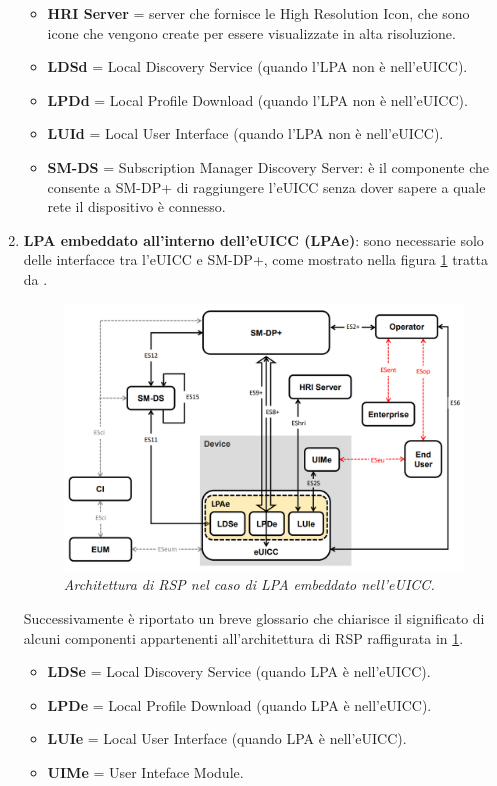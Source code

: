\documentclass[10pt, oneside]{book}
\begin{document}
\begin{enumerate}
\begin{itemize}
\item \textbf{HRI Server} = server che fornisce le High Resolution Icon, che sono icone che vengono create per essere visualizzate in alta risoluzione.
\item \textbf{LDSd} = Local Discovery Service (quando l'LPA non è nell'eUICC).
\item \textbf{LPDd} = Local Profile Download (quando l'LPA non è nell'eUICC).
\item \textbf{LUId} = Local User Interface (quando l'LPA non è nell'eUICC).
\item \textbf{SM-DS} = Subscription Manager Discovery Server: è il componente che consente a SM-DP+ di raggiungere l'eUICC senza dover sapere a quale rete il dispositivo è connesso.
\end{itemize}
\item \textbf{LPA embeddato all'interno dell'eUICC (LPAe)}: sono necessarie solo delle interfacce tra l'eUICC e SM-DP+, come mostrato nella figura \ref{fig:RSP-LPAe} tratta da \cite{GSMA-docs-new}.
\begin{figure}
\includegraphics[width=\linewidth]{RSP-LPAe.png}
\caption{\textit{Architettura di RSP nel caso di LPA embeddato nell'eUICC.}}
\label{fig:RSP-LPAe}
\end{figure}
Successivamente è riportato un breve glossario che chiarisce il significato di alcuni componenti appartenenti all'architettura di RSP raffigurata in \ref{fig:RSP-LPAe}.
\begin{itemize}
\item \textbf{LDSe} = Local Discovery Service (quando LPA è nell'eUICC).
\item \textbf{LPDe} = Local Profile Download (quando LPA è nell'eUICC).
\item \textbf{LUIe} = Local User Interface (quando LPA è nell'eUICC).
\item \textbf{UIMe} = User Inteface Module.
\end{itemize}
\end{enumerate}
\end{document}

